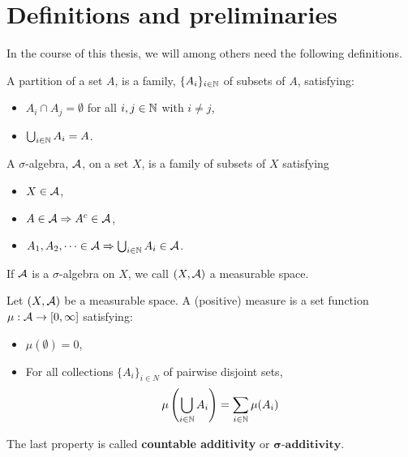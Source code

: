 \section{Definitions and preliminaries}

In the course of this thesis, we will among others need the following definitions.


\begin{definition}
A partition of a set $A$, is a family, $\{A_{i}\}_{i\in \mathbb{N}}$ of subsets of $A$, satisfying:
\begin{itemize}
\item $A_{i} \cap A_{j} = \emptyset$ for all $i, j\in \mathbb{N}$ with $i \neq j$,
\item $\bigcup_{i\in \mathbb{N}} A_{i}=A$.
\end{itemize}
\end{definition}


\begin{definition}
A $\sigma$-algebra, $\mathcal{A}$, on a set $X$, is a family of subsets of $X$ satisfying
\begin{itemize}
\item $X\in \mathcal{A}$,
\item $A \in \mathcal{A} \Rightarrow A^{c}\in \mathcal{A}$,
\item $A_{1}, A_{2}, \dots \in \mathcal{A} \Rightarrow \bigcup_{i\in \mathbb{N}} A_{i} \in \mathcal{A}$.
\end{itemize}
\end{definition}

If $\mathcal{A}$ is a $\sigma$-algebra on $X$, we call $(X, \mathcal{A})$ a measurable space.

\begin{definition}
Let $(X,\mathcal{A})$ be a measurable space. A (positive) measure is a set function $\mu:\mathcal{A} \to [0,\infty]$ satisfying:
\begin{itemize}
\item $\mu(\emptyset) = 0$,
\item For all collections $\{A_{i}\}_{i\in N}$ of pairwise disjoint sets,
\begin{align*}
	\mu\left(\bigcup_{i\in \mathbb{N}} A_{i}\right) = \sum_{i\in \mathbb{N}} \mu(A_{i})
\end{align*}
\end{itemize}
The last property is called \textbf{countable additivity} or $\textbf{$\mathbf{\sigma}$-additivity}$.
\end{definition}

